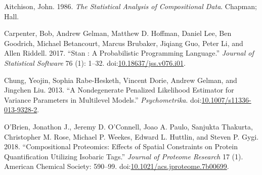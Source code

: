 \documentclass[]{article}
\begin{document}
\hypertarget{refs}{}
\hypertarget{ref-Aitchison1986}{}
Aitchison, John. 1986. \emph{The Statistical Analysis of Compositional
Data}. Chapman; Hall.

\hypertarget{ref-Carpenter2017}{}
Carpenter, Bob, Andrew Gelman, Matthew D. Hoffman, Daniel Lee, Ben
Goodrich, Michael Betancourt, Marcus Brubaker, Jiqiang Guo, Peter Li,
and Allen Riddell. 2017. ``Stan : A Probabilistic Programming
Language.'' \emph{Journal of Statistical Software} 76 (1): 1--32.
doi:\href{https://doi.org/10.18637/jss.v076.i01}{10.18637/jss.v076.i01}.

\hypertarget{ref-Chung2013}{}
Chung, Yeojin, Sophia Rabe-Hesketh, Vincent Dorie, Andrew Gelman, and
Jingchen Liu. 2013. ``A Nondegenerate Penalized Likelihood Estimator for
Variance Parameters in Multilevel Models.'' \emph{Psychometrika}.
doi:\href{https://doi.org/10.1007/s11336-013-9328-2}{10.1007/s11336-013-9328-2}.

\hypertarget{ref-OBrien2018}{}
O'Brien, Jonathon J., Jeremy D. O'Connell, Joao A. Paulo, Sanjukta
Thakurta, Christopher M. Rose, Michael P. Weekes, Edward L. Huttlin, and
Steven P. Gygi. 2018. ``Compositional Proteomics: Effects of Spatial
Constraints on Protein Quantification Utilizing Isobaric Tags.''
\emph{Journal of Proteome Research} 17 (1). American Chemical Society:
590--99.
doi:\href{https://doi.org/10.1021/acs.jproteome.7b00699}{10.1021/acs.jproteome.7b00699}.
\end{document}
